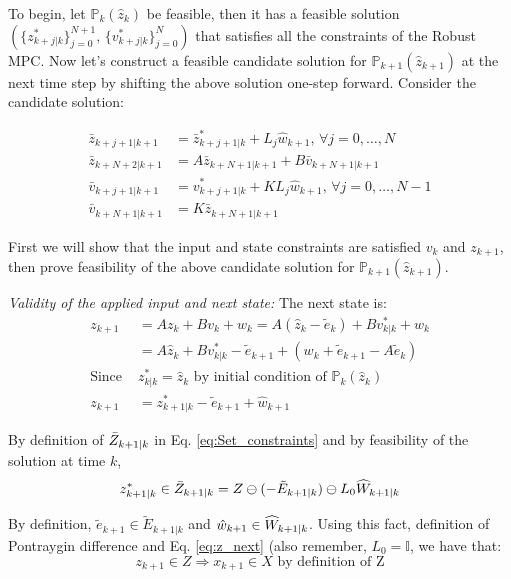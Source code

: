 To begin, let $\mathbb{P}_{k}(\hat{z}_k)$ be feasible, then it has a feasible solution $(\lbrace z^{*}_{k+j|k}\rbrace_{j=0}^{N+1}, \, \lbrace v^{*}_{k+j|k}\rbrace_{j=0}^{N} )$ that satisfies all the constraints of the Robust MPC. Now let's construct a feasible candidate solution for $\mathbb{P}_{k+1}(\hat{z}_{k+1})$ at the next time step by shifting the above solution one-step forward. Consider the candidate solution:

\begin{subequations}
\begin{align}
\label{eq:candidate}
\bar{z}_{k+j+1|k+1} &= \bar{z}^{*}_{k+j+1|k} + L_j\hat{w}_{k+1}, \, \forall j =0,\dotsc,N \\
\bar{z}_{k+N+2|k+1}&= A\bar{z}_{k+N+1|k+1} + B\bar{v}_{k+N+1|k+1} \\
\bar{v}_{k+j+1|k+1}&=v^{*}_{k+j+1|k} + KL_j\hat{w}_{k+1}, \, \forall j =0,\dotsc,N-1 \\
\bar{v}_{k+N+1|k+1}&=K\bar{z}_{k+N+1|k+1} 
\end{align}
\end{subequations}

First we will show that the input and state constraints are satisfied $v_k$ and $z_{k+1}$, then prove feasibility of the above candidate solution for $\mathbb{P}_{k+1}(\hat{z}_{k+1})$.

\textit{Validity of the applied input and next state:}
The next state is:
\begin{subequations}
\begin{align}
\label{eq:z_next}
z_{k+1} &= Az_k + Bv_k + w_k = A(\hat{z}_k-\tilde{e}_k)+Bv^{*}_{k|k}+w_k \\
 &= A\hat{z}_k+Bv^{*}_{k|k}-\tilde{e}_{k+1}+(w_k+\tilde{e}_{k+1}-A\tilde{e}_k) \\
\text{Since }& z^{*}_{k|k}=\hat{z}_k \text{ by initial condition of } \mathbb{P}_{k}(\hat{z}_k) \nonumber \\
z_{k+1}&= z^{*}_{k+1|k} - \tilde{e}_{k+1} + \hat{w}_{k+1}
\end{align}
\end{subequations}

By definition of $\bar{Z}_{k+1|k}$ in Eq. \ref{eq:Set_constraints} and by feasibility of the solution at time $k$,
\begin{equation}
z^{*}_{k+1|k} \in\bar{Z}_{k+1|k} = Z \ominus (-\tilde{E}_{k+1|k}) \ominus L_0\widehat{W}_{k+1|k}
\end{equation}

By definition, $\tilde{e}_{k+1} \in \tilde{E}_{k+1|k}$ and $\hat{w}_{k+1} \in  \widehat{W}_{k+1|k}$. Using this fact, definition of Pontraygin difference and Eq. \ref{eq:z_next} (also remember, $L_0 = \mathbb{I}$, we have that:
\begin{equation}
z_{k+1}\in Z \Rightarrow x_{k+1} \in X \text{ by definition of Z}
\end{equation}

